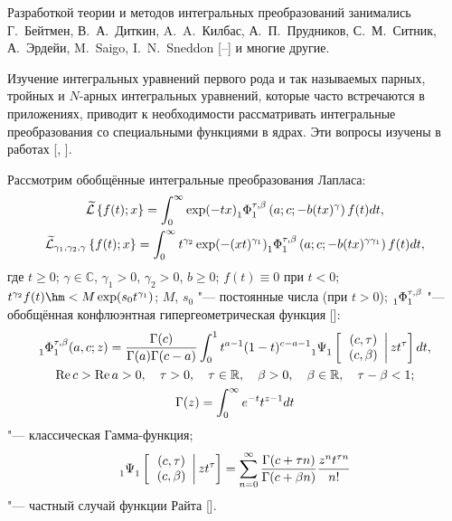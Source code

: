 Разработкой теории и методов интегральных преобразований занимались Г.~Бейтмен, В.~А.~Диткин,  A.~A.~Килбас, А.~П.~Прудников, С.~М.~Ситник, А.~Эрдейи, M.~Saigo, I.~N.~Sneddon [--] и многие другие.
   
Изучение интегральных уравнений первого рода и так называемых парных, тройных и $N$-арных интегральных уравнений, которые часто встречаются в приложениях, приводит к необходимости рассматривать интегральные преобразования со специальными функциями в ядрах. 
Эти вопросы изучены в работах [, ].
   
   
Рассмотрим обобщённые интегральные преобразования Лапласа:   
\begin{gather}
\label{zaik:1}
\widetilde {\mathcal L}\left\{f(t);x\right\}=\int_0^{\infty}
\exp(-tx) {\mathstrut}_1\Phi {\mathstrut}_1^{\tau,\beta}\left(a; c; -b(tx)^{\gamma}\right)f(t)dt,
\\
\label{zaik:2}
\widetilde {\mathcal L}_{\gamma_1,\gamma_2,\gamma} \left\{f(t);x\right\}=\int_0^{\infty}t^{\gamma_2}
\exp(-(xt)^{\gamma_1}) {\mathstrut}_1\Phi {\mathstrut}_1^{\tau,\beta}\left(a; c; -b(tx)^{\gamma \gamma_1}\right) f(t)dt,
\end{gather}
где $t\geq 0$; 
$\gamma\in \mathbb C$, 
$\gamma_1>0$, $\gamma_2>0$, $b\geq 0$; 
$f(t)\equiv 0$ при $t<0$;  $t^{\gamma_2}f(t)\hm <M \exp(s_0 t^{\gamma_1})$; 
$M$, $s_0$ "--- постоянные числа (при $t>0$);
${\mathstrut}_1\Phi{\mathstrut}_1^{\tau,\beta}$ "--- обобщённая конфлюэнтная гипергеометрическая функция []:
\begin{gather*}
{\mathstrut}_1\Phi{\mathstrut}_1^{\tau,\beta}(a,c;z)=
\frac{\Gamma(c)}{\Gamma(a)\Gamma(c-a)} 
\int_0^1 t^{a-1}(1-t)^{c-a-1} {\mathstrut}_1\Psi{\mathstrut}_1 
     \left[ \left. \begin{array}{c}
             (c,\tau)\\
             (c,\beta)
            \end{array} \right| zt^\tau
     \right] dt, 
\\
\mathop{\rm Re} c>\mathop{\rm Re} a>0, \quad  \tau>0, \quad  \tau\in \mathbb R, \quad  \beta>0, \quad  \beta\in \mathbb R, \quad  \tau-\beta<1;\\
\Gamma(z)=\int_0^{\infty}e^{-t}t^{z-1}dt
\end{gather*}
 "---  классическая Гамма-функция;
$${\mathstrut}_1\Psi{\mathstrut}_1 
     \left[ \left. \begin{array}{c}
             (c,\tau)\\
             (c,\beta)
            \end{array} \right| zt^\tau
     \right]=\sum\limits_{n=0}^{\infty}\frac{\Gamma(c+\tau n)}{\Gamma(c+\beta n)}\frac{z^n t^{\tau n}}{n!} $$ 
"--- частный случай функции Райта [].
     
